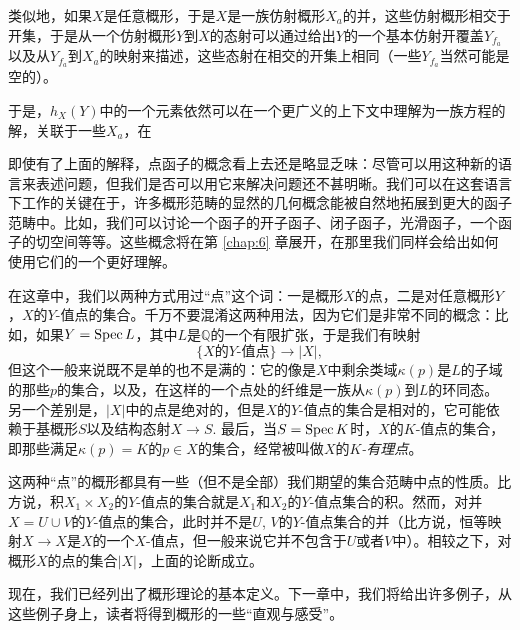 类似地，如果$X$是任意概形，于是$X$是一族仿射概形$X_a$的并，这些仿射概形相交于开集，于是从一个仿射概形$Y$到$X$的态射可以通过给出$Y$的一个基本仿射开覆盖$Y_{f_a}$以及从$Y_{f_a}$到$X_a$的映射来描述，这些态射在相交的开集上相同（一些$Y_{f_a}$当然可能是空的）。

于是，$h_X(Y)$中的一个元素依然可以在一个更广义的上下文中理解为一族方程的解，关联于一些$X_a$，在 \nottran

即使有了上面的解释，点函子的概念看上去还是略显乏味：尽管可以用这种新的语言来表述问题，但我们是否可以用它来解决问题还不甚明晰。我们可以在这套语言下工作的关键在于，许多概形范畴的显然的几何概念能被自然地拓展到更大的函子范畴中。比如，我们可以讨论一个函子的开子函子、闭子函子，光滑函子，一个函子的切空间等等。这些概念将在第 \ref{chap:6} 章展开，在那里我们同样会给出如何使用它们的一个更好理解。

在这章中，我们以两种方式用过“点”这个词：一是概形$X$的点，二是对任意概形$Y$，$X$的$Y$-值点的集合。千万不要混淆这两种用法，因为它们是非常不同的概念：比如，如果$Y=\operatorname{Spec} L$，其中$L$是$\mathbb{Q}$的一个有限扩张，于是我们有映射
\[
	\{\textit{$X$的$Y$-值点}\}\to |X|,
\]
但这个一般来说既不是单的也不是满的：它的像是$X$中剩余类域$\kappa(p)$是$L$的子域的那些$p$的集合，以及，在这样的一个点处的纤维是一族从$\kappa(p)$到$L$的环同态。另一个差别是，$|X|$中的点是绝对的，但是$X$的$Y$-值点的集合是相对的，它可能依赖于基概形$S$以及结构态射$X\to S$. 最后，当$S=\operatorname{Spec} K$时，$X$的$K$-值点的集合，即那些满足$\kappa(p)=K$的$p\in X$的集合，经常被叫做$X$的\textit{$K$-有理点}。

这两种“点”的概形都具有一些（但不是全部）我们期望的集合范畴中点的性质。比方说，积$X_1\times X_2$的$Y$-值点的集合就是$X_1$和$X_2$的$Y$-值点集合的积。然而，对并$X=U\cup V$的$Y$-值点的集合，此时并不是$U$, $V$的$Y$-值点集合的并（比方说，恒等映射$X\to X$是$X$的一个$X$-值点，但一般来说它并不包含于$U$或者$V$中）。相较之下，对概形$X$的点的集合$|X|$，上面的论断成立。

现在，我们已经列出了概形理论的基本定义。下一章中，我们将给出许多例子，从这些例子身上，读者将得到概形的一些“直观与感受”。